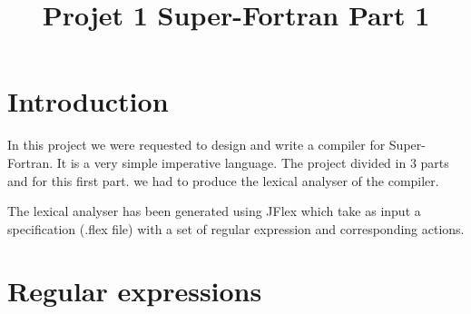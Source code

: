 \documentclass[12pt]{article}
\title{Projet 1 Super-Fortran Part 1}
\begin{document}
\section{Introduction}
In this project we were requested to design and write a compiler for Super-Fortran. It is a very simple 
imperative language. The project divided in 3 parts and for this first part. we had to produce 
the lexical analyser of the compiler.

The lexical analyser has been generated using JFlex which take as input a specification (.flex file)
 with a set of regular expression and corresponding actions. %

\section{Regular expressions}
\end{document}
